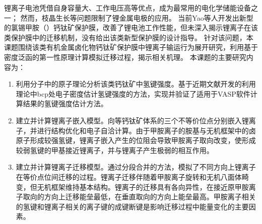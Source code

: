 
\begin{cabstract}

锂离子电池凭借自身容量大、工作电压高等优点，成为最常用的电化学储能设备之一；
然而，枝晶生长等问题限制了锂金属电极的应用。
当前Yao等人开发出新型的氯锡甲胺（）钙钛矿保护膜，改善了锂电池工作性能，但未深入揭示锂离子在该类保护膜中的迁移机制，没有给出该类新型保护膜的设计指导。
针对该问题，本课题围绕该类有机金属卤化物钙钛矿保护膜中锂离子输运行为展开研究，利用基于密度泛函的第一性原理计算模拟迁移过程，揭示相关机理。
本课题的主要研究内容为：
\begin{enumerate}
    \item 利用分子中的原子理论分析该类钙钛矿中氢键强度。基于近期文献开发的利用理论中bcp处电子密度估计氢键强度的方法，实现并验证了适用于VASP软件计算结果的氢键强度估计方法。
    \item 建立并计算锂离子嵌入模型。向等钙钛矿体系的三个不等价位点分别嵌入锂离子，并进行结构优化和电子自洽计算。由于甲胺离子的胺基与无机框架中的卤原子形成较强氢键，锂离子嵌入产生的位阻会导致甲胺离子取向改变，使形成较弱氢键的甲基接近锂离子，并与锂离子产生极弱的相互作用。
    \item 建立并计算锂离子迁移模型。通过分段合并的方法，模拟了不同方向上锂离子在等价点位间迁移的过程。锂离子迁移伴随着甲胺离子旋转和无机八面体畸变，但无机框架维持基本结构。锂离子的迁移具有各向异性，在接近原甲胺离子取向的方向上迁移能垒最低，在垂直取向的方向上能垒最高。甲胺离子相关的氢键和锂离子相关的离子键的成键断键是影响迁移过程中能量变化的主要因素。
\end{enumerate}

\end{cabstract}

